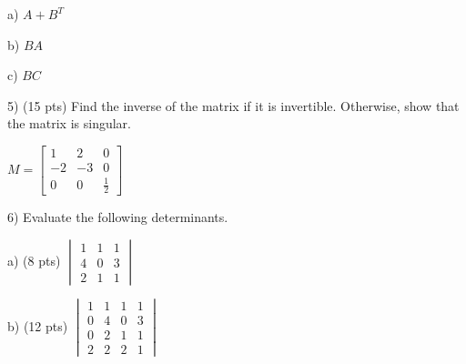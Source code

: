 \documentclass{article}
\begin{document}
\begin{flushleft}
a) $A + B^{T}$

\vspace{1in}

b) $BA$

\vspace{1in}

c) $BC$

\vspace{1in}

5) (15 pts) Find the inverse of the matrix if it is invertible.  Otherwise, show that the matrix is singular.

\vspace{0.2in}

$M = \begin{bmatrix}
1 & 2 & 0\\
-2 & -3 & 0\\
0 & 0 & \frac{1}{2}
\end{bmatrix}$

\pagebreak

6) Evaluate the following determinants.

\vspace{0.2in}

a) (8 pts) $\begin{vmatrix}
1 & 1 & 1\\
4 & 0 & 3\\
2 & 1 & 1
\end{vmatrix}$

\vspace{3in}

b) (12 pts) $\begin{vmatrix}
1 & 1 & 1 & 1\\
0 & 4 & 0 & 3\\
0 & 2 & 1 & 1\\
2 & 2 & 2 & 1
\end{vmatrix}$


\end{flushleft}
\end{document}
